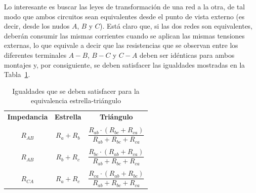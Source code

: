 \documentclass[11pt]{book} %
\numberwithin{dummy}{section}
\theoremstyle{ocrenumbox}
\theoremstyle{blacknumex}
\theoremstyle{blacknumbox}
\theoremstyle{ocrenum}
\begin{document}
	Lo interesante es buscar las leyes de transformación de una red a la otra, de tal modo que ambos circuitos sean equivalentes desde el punto de vista externo (es decir,
	desde los nudos $A$, $B$ y $C$). Está claro que, si las dos redes son equivalentes, deberán consumir las mismas
	corrientes cuando se aplican las mismas tensiones externas, lo que equivale a decir que las resistencias que se observan entre los diferentes terminales $A-B$, $B-C$ y $C-A$ deben ser idénticas para ambos montajes y, por consiguiente, se
	deben satisfacer las igualdades mostradas en la Tabla~\ref{tab.igualdades_estrellatriangulo}. 
	\begin{table}[htbp]
		\centering
		\begin{tabular}{c|c|c}
			\rowcolor{ocre!50} \textbf{Impedancia} & \textbf{Estrella} & \textbf{Triángulo}\\
			&&        \\[-0.75em]
			$R_{AB}$ & $R_a+R_b$ & $\dfrac{R_{ab} \cdot (R_{bc} + R_{ca})}{R_{ab} + R_{bc} + R_{ca}}$\\
			&&         \\[-0.75em]
			$R_{AB}$ & $R_b+R_c$ & $\dfrac{R_{bc} \cdot (R_{ab} + R_{ca})}{R_{ab} + R_{bc} + R_{ca}}$\\
			&& \\[-0.75em]
			$R_{CA}$ & $R_a+R_c$ & $\dfrac{R_{ca} \cdot (R_{ab} + R_{bc})}{R_{ab} + R_{bc} + R_{ca}}$\\
		\end{tabular}
		\caption{Igualdades que se deben satisfacer para la equivalencia estrella-triángulo}
		\label{tab.igualdades_estrellatriangulo}
	\end{table}
	
\end{document}
